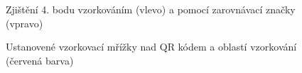 \begin{figure}[H]
  \begin{center}
    \caption{Zjištění 4. bodu vzorkováním (vlevo) a pomocí zarovnávací značky
    (vpravo)}
    \label{DeterminingTheFourthPointForTransformation}
  \end{center}
\end{figure}

\begin{figure}[H]
  \begin{center}
    \caption{Ustanovené vzorkovací mřížky nad QR kódem a oblastí vzorkování
    (červená barva)}
    \label{SamplingGrid}
  \end{center}
\end{figure}

